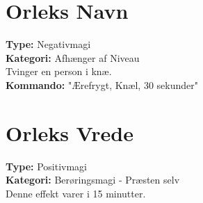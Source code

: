 \section{Orleks Navn}
\textbf{Type:} Negativmagi\\ 
\textbf{Kategori:} Afhænger af Niveau\\
Tvinger en person i knæ.\\
\textbf{Kommando:} "Ærefrygt, Knæl, 30 sekunder"

\section{Orleks Vrede}
\textbf{Type:} Positivmagi\\
\textbf{Kategori:} Berøringsmagi - Præsten selv\\
Denne effekt varer i 15 minutter.\\